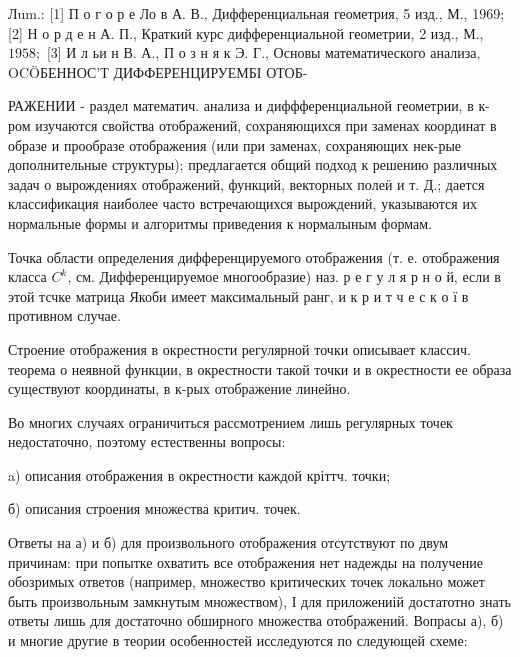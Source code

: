 \documentclass[10pt]{article}
\begin{document}
Лum.: [1] П о г о р е Ло в А. В., Дифференциальная геометрия, 5 изд., М., 1969; [2] Н о р д е н А. П., Краткий курс дифференциальной геометрии, 2 изд., М., $1958 ;$ [3] И л ьи н В. А., П о з н я к Э. Г., Основы математического анализа, OCÖБЕННОС'Т ДИФФЕРЕНЦИРУЕМБІ ОТОБ-



РАЖЕНИИ - раздел математич. анализа и диффференциальной геометрии, в к-ром изучаются свойства отображений, сохраняющихся при заменах координат в образе и прообразе отображения (или при заменах, сохраняющих нек-рые дополнительные структуры); предлагается общий подход к решению различных задач о вырождениях отображений, функций, векторных полеӥ и т. Д.; дается классификация наиболее часто встречающихся вырождений, указываются их нормальные формы и алгоритмы приведения к нормалыным формам.



Точка области определения дифференцируемого отображения (т. е. отображения класса $C^{k}$, см. Дифференцируемое многообразие) наз. р е г у л я р н о й, если в этой тсчке матрица Якоби имеет максимальный ранг, и к р и т ч е с к о ї в противном случае.



Строение отображения в окрестности регулярной точки описывает классич. теорема о неявной функции, в окрестности такой точки и в окрестности ее образа существуют координаты, в к-рых отображение линейно.



Во многих случаях ограничиться рассмотрением лишь регулярных точек недостаточно, поэтому естественны вопросы:



a) описания отображения в окрестности каждой кріттч. точки;



б) описания строения множества критич. точек.



Ответы на а) и б) для произвольного отображения отсутствуют по двум причинам: при попытке охватить все отображения нет надежды на получение обозримых ответов (например, множество критических точек локально может быть произвольным замкнутым множеством), І для приложениій достатотно знать ответы лишь для достаточно обширного множества отображений. Вопрасы а), б) и многие другие в теории особенностей исследуются по следующей схеме:
\end{document}
